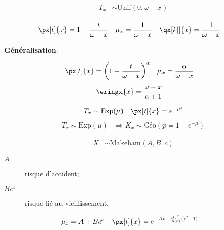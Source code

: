 \documentclass[10pt, french]{article}
\begin{document}
\begin{multicols*}{3}
\begin{rappel_enhanced}
\begin{gather}
\begin{align*}
	T_{x} 
	&\sim	\text{Unif}(0, \omega - x)
\end{align*}
\end{gather}

\begin{align*}
	\px[t]{x} 
		&= 	1 - \frac{t}{\omega - x} &
	\mu_x 
		&=	\frac{1}{\omega - x}	&
	\qx[k |]{x} 
		&=	\frac{1}{\omega - x}
\end{align*}

\tcbline

\textbf{Généralisation}:

\begin{align*}
	\px[t]{x} 
	&= \left( 1 - \frac{t}{\omega - x} \right)^{\alpha} &
	\mu_x 
	&=	\frac{\alpha}{\omega - x}	
\end{align*}
\begin{align*}
	\eringx{x}	
	&=	\frac{\omega - x}{\alpha + 1}
\end{align*}
\end{rappel_enhanced}


\begin{rappel_enhanced}
\begin{center}
\begin{align*}
	T_x 			
	&\sim 	\mathrm{Exp}(\mu) &
	\px[t]{x} 	
	&= 		e^{-\mu t}	\\
\end{align*}
\begin{align*}
	T_x \sim \text{Exp}(\mu) &\Rightarrow K_x \sim \text{Géo}(p = 1 - e^{-\mu}) 
\end{align*}
\end{center}
\end{rappel_enhanced}


\begin{rappel_enhanced}
\begin{align*}
	X &\sim \text{Makeham}(A, B, c) 
\end{align*}
\begin{description}
	\item[$A$]	risque d'accident;
	\item[$Bc^{x}$]	risque lié au vieillissement.
\end{description}

\begin{align*}
	\mu_x 
	&=	A + B c^{x} &
	\px[t]{x}
	&=	\textrm{e}^{-At - \frac{B c^{x}}{\ln(c)}(c^{t} - 1)}
\end{align*}


\end{rappel_enhanced}
\end{multicols*}
\end{document}
